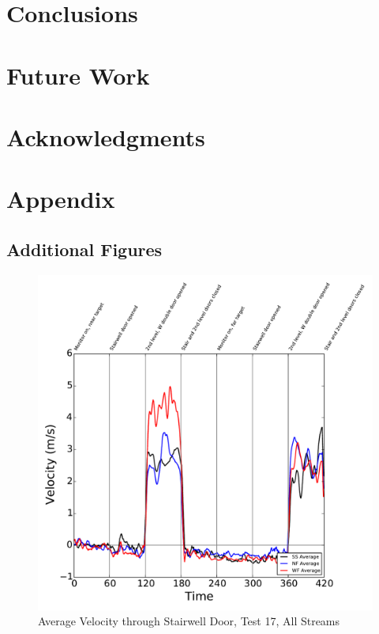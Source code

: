 \documentclass[12pt,oneside]{book}
\begin{document}
\chapter{Conclusions}
\label{chap:Conclusions}

\chapter{Future Work}
\label{chap:Future_Work}

\chapter{Acknowledgments}
\label{chap:Acknowledgments}



\appendix
\chapter{Appendix}
\label{chap:appendix}

\section{Additional Figures}
\label{sec:additional_figures}

\begin{figure}[!ht]
\includegraphics[width=6in]{../../../Figures/Hose_Test_Figures/Test_17_West_063014_BDP_A13_Avg}
\caption{Average Velocity through Stairwell Door, Test 17, All Streams}
\label{fig:Test_17_BDP_A10_Avg_All}
\end{figure}
\end{document}
